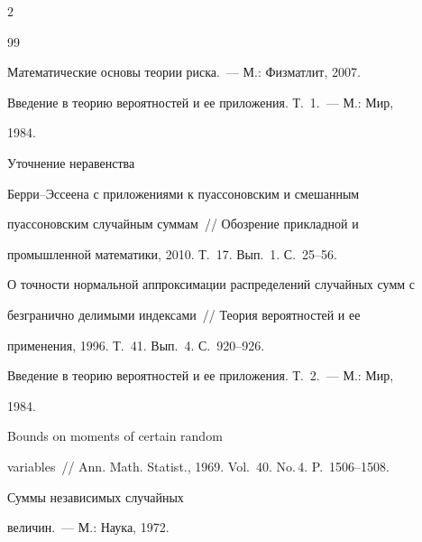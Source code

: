 \begin{multicols}{2}
{{\begin{thebibliography}{99}


Математические основы теории риска.~--- М.: Физматлит, 2007.







 Введение в теорию вероятностей и ее приложения. Т.~1.~--- М.: Мир,


1984.







 Уточнение неравенства


Берри--Эссеена с приложениями к пуассоновским и смешанным


пуассоновским случайным суммам~// Обозрение прикладной и


промышленной математики, 2010. Т.~17. Вып.~1. С.~25--56.










 О точности нормальной аппроксимации распределений случайных сумм с


безгранично делимыми индексами~// Теория вероятностей и ее


применения, 1996. Т.~41. Вып.~4. С.~920--926.









Введение в теорию вероятностей и ее приложения. Т.~2.~--- М.: Мир,


1984.










 Bounds on moments of certain random


variables~// Ann. Math. Statist., 1969. Vol.~40. No.\,4. P.~1506--1508.







 Суммы независимых случайных


величин.~--- М.: Наука, 1972.






\end{thebibliography}}}
\end{multicols}
